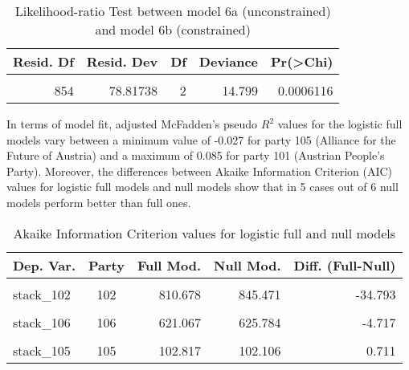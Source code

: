 \documentclass[
]{article}
\begin{document}
\begin{table}[!h]

\caption{\label{tab:unnamed-chunk-5}Likelihood-ratio Test between model 6a (unconstrained) and model 6b (constrained)
                  \label{table:lrtest_1_at}}
\centering
\begin{tabular}[t]{r|r|r|r|r}
\hline
Resid. Df & Resid. Dev & Df & Deviance & Pr(>Chi)\\
\hline
\cellcolor{gray!6}{856} & \cellcolor{gray!6}{93.61638} & \cellcolor{gray!6}{} & \cellcolor{gray!6}{} & \cellcolor{gray!6}{}\\
\hline
854 & 78.81738 & 2 & 14.799 & 0.0006116\\
\hline
\end{tabular}
\end{table}

In terms of model fit, adjusted McFadden's pseudo \(R^2\) values for the logistic full models vary between
a minimum value of
-0.027
for party 105
(Alliance for the Future of Austria)
and a maximum of
0.085
for party 101
(Austrian People's Party).
Moreover, the differences between Akaike Information Criterion (AIC) values for logistic full models and
null models show that in 5 cases out of 6 null models perform better than full ones.

\begin{table}[!h]

\caption{\label{tab:unnamed-chunk-6}Akaike Information Criterion values for logistic full and null models 
        \label{table:logit_aic_cy}}
\centering
\begin{tabular}[t]{lcrrr}
\toprule
Dep. Var. & Party & Full Mod. & Null Mod. & Diff. (Full-Null)\\
\midrule
\cellcolor{gray!6}{stack\_101} & \cellcolor{gray!6}{101} & \cellcolor{gray!6}{792.119} & \cellcolor{gray!6}{868.142} & \cellcolor{gray!6}{-76.023}\\
stack\_102 & 102 & 810.678 & 845.471 & -34.793\\
\cellcolor{gray!6}{stack\_104} & \cellcolor{gray!6}{104} & \cellcolor{gray!6}{479.493} & \cellcolor{gray!6}{483.460} & \cellcolor{gray!6}{-3.967}\\
stack\_106 & 106 & 621.067 & 625.784 & -4.717\\
\cellcolor{gray!6}{stack\_103} & \cellcolor{gray!6}{103} & \cellcolor{gray!6}{794.266} & \cellcolor{gray!6}{806.568} & \cellcolor{gray!6}{-12.302}\\
\addlinespace
stack\_105 & 105 & 102.817 & 102.106 & 0.711\\
\bottomrule
\end{tabular}
\end{table}
\end{document}
